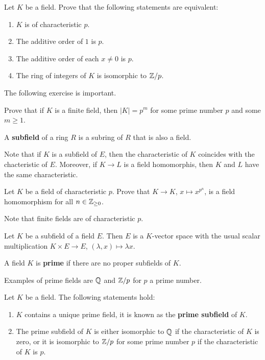 \begin{exercise}
	Let $K$ be a field. Prove that
	the following statements are equivalent:
	\begin{enumerate}
		\item $K$ is of characteristic $p$.
		\item The additive order of $1$ is $p$. 
		\item The additive order of each $x\ne0$ is $p$.
		\item The ring of integers of $K$ is isomorphic to $\mathbb{Z}/p$.
	\end{enumerate}
\end{exercise}

The following exercise is important. 

\begin{exercise}
	Prove that if $K$ is a finite field, then
	$|K|=p^m$ for some prime number $p$ and some $m\geq1$. 
\end{exercise}

\begin{definition}
	A \textbf{subfield} of a ring $R$ is a subring of $R$ 
	that is also a field.
\end{definition}

Note that if $K$ is a subfield of $E$, then
the characteristic of $K$ coincides
with the chacteristic 
of $E$. Moreover, if $K\to L$ is a field homomorphis, then
$K$ and $L$ have the same characteristic. 

\begin{exercise}
	Let $K$ be a field of characteristic $p$. Prove
	that $K\to K$, $x\mapsto x^{p^n}$, is a field homomorphism
	for all $n\in\mathbb{Z}_{\geq 0}$. 
\end{exercise}

Note that finite fields are of characteristic $p$. 

Let $K$ be a subfield of a field $E$. Then $E$ 
is a $K$-vector space with the usual scalar multiplication
$K\times E\to E$, 
$(\lambda, x)\mapsto \lambda x$.

\begin{definition}
	A field $K$ is \textbf{prime} if there are no
	proper subfields of $K$. 
\end{definition}

Examples of prime fields are $\mathbb{Q}$ and $\mathbb{Z}/p$ for $p$ a prime number.

\begin{proposition}
	Let $K$ be a field. The following statements hold:
	\begin{enumerate}
		\item $K$ contains a unique prime field, it is known as the 
			\textbf{prime subfield} of $K$.
		\item The prime subfield of $K$ is either isomorphic to $\mathbb{Q}$ if 
			the characteristic of $K$ is zero, or it is isomorphic to $\mathbb{Z}/p$ for
			some prime number $p$ if the characteristic of $K$ is $p$. 
	\end{enumerate}
\end{proposition}

